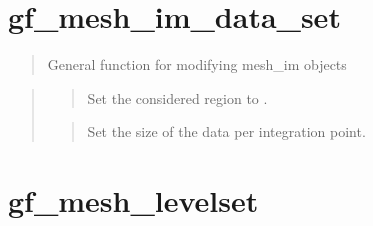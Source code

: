 \documentclass[a4paper,11pt,english]{sphinxmanual}
\begin{document}
\section{gf\_mesh\_im\_data\_set}
\label{\detokenize{matlab_octave/cmdref_gf_mesh_im_data_set:gf-mesh-im-data-set}}\label{\detokenize{matlab_octave/cmdref_gf_mesh_im_data_set::doc}}

\begin{sphinxVerbatim}[commandchars=\\\{\}]
    
  
\end{sphinxVerbatim}

\begin{quote}

General function for modifying mesh\_im objects
\end{quote}

\begin{quote}

\begin{quote}

Set the considered region to .
\end{quote}

\begin{quote}

Set the size of the data per integration point.
\end{quote}
\end{quote}


\section{gf\_mesh\_levelset}
\label{\detokenize{matlab_octave/cmdref_gf_mesh_levelset:gf-mesh-levelset}}\label{\detokenize{matlab_octave/cmdref_gf_mesh_levelset::doc}}
\end{document}
